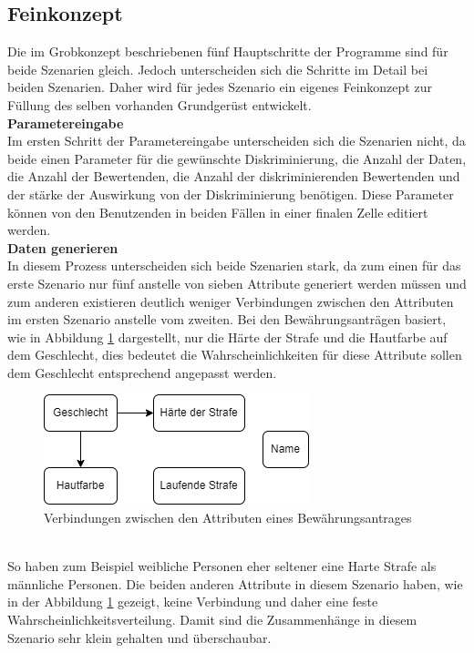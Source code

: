 \begin{onehalfspace}
\subsection{Feinkonzept}
\label{subsubsec:feinkonzept}
Die im Grobkonzept beschriebenen fünf Hauptschritte der Programme sind für beide Szenarien gleich. Jedoch unterscheiden sich die Schritte im Detail bei beiden Szenarien. Daher wird für jedes Szenario ein eigenes Feinkonzept zur Füllung des selben vorhanden Grundgerüst entwickelt.\\
\textbf{Parametereingabe}\\
Im ersten Schritt der Parametereingabe unterscheiden sich die Szenarien nicht, da beide einen Parameter für die gewünschte Diskriminierung, die Anzahl der Daten, die Anzahl der Bewertenden, die Anzahl der diskriminierenden Bewertenden und der stärke der Auswirkung von der Diskriminierung benötigen. Diese Parameter können von den Benutzenden in beiden Fällen in einer finalen Zelle editiert werden.\\
\textbf{Daten generieren}\\
In diesem Prozess unterscheiden sich beide Szenarien stark, da zum einen für das erste Szenario nur fünf anstelle von sieben Attribute generiert werden müssen und zum anderen existieren deutlich weniger Verbindungen zwischen den Attributen im ersten Szenario anstelle vom zweiten. Bei den Bewährungsanträgen basiert, wie in Abbildung \ref{fig:VerbindungenS1} dargestellt, nur die Härte der Strafe und die Hautfarbe auf dem Geschlecht, dies bedeutet die Wahrscheinlichkeiten für diese Attribute sollen dem Geschlecht entsprechend angepasst werden.
\begin{figure}[h]
    \centering
    \includegraphics{Diagramme/Verbindung_der_Attribute_S1.drawio.png}
    \caption{Verbindungen zwischen den Attributen eines Bewährungsantrages}
    \label{fig:VerbindungenS1}
\end{figure}\\
So haben zum Beispiel weibliche Personen eher seltener eine Harte Strafe als männliche Personen. Die beiden anderen Attribute in diesem Szenario haben, wie in der Abbildung \ref{fig:VerbindungenS1} gezeigt, keine Verbindung und daher eine feste Wahrscheinlichkeitsverteilung. Damit sind die Zusammenhänge in diesem Szenario sehr klein gehalten und überschaubar.\\

\end{onehalfspace}
